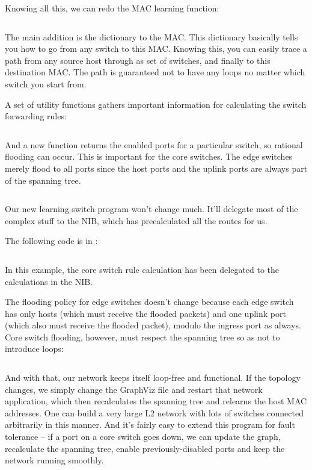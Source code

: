 Knowing all this, we can redo the MAC learning function:

\inputminted[firstline=116,lastline=148]{python}{code/multiswitch_topologies/network_information_base_from_file.py}

The main addition is the  dictionary to the MAC.   This dictionary basically tells you how to
go from any switch to this MAC.  Knowing this, you can easily trace a path from any source host through as set
of switches, and finally to this destination MAC.  The path is guaranteed not to have any loops no matter
which switch you start from.  

A set of utility functions gathers important information for calculating the switch 
forwarding rules:

\inputminted[firstline=95,lastline=115]{python}{code/multiswitch_topologies/network_information_base_from_file.py}

And a new function returns the enabled ports for a particular switch, so rational flooding can occur.
This is important for the core switches.  The edge switches merely flood to all ports since the host ports
and the uplink ports are always part of the spanning tree.   

\inputminted[firstline=194,lastline=196]{python}{code/multiswitch_topologies/network_information_base_from_file.py}

Our new learning switch program won't change much.  It'll delegate most of the complex stuff to the 
NIB, which has precalculated all the routes for us.  

The following code is in :

\inputminted[firstline=62,lastline=71]{python}{code/multiswitch_topologies/multiswitch3.py}

In this example, the core switch rule calculation has been delegated to the  calculations in
the NIB.  

The flooding policy for edge switches doesn't change because each edge switch has only hosts (which must
receive the flooded packets) and one uplink port (which also must receive the flooded packet), modulo the
ingress port as always.  Core switch flooding, however, must respect the spanning tree so as not to
introduce loops:

\inputminted[firstline=22,lastline=26]{python}{code/multiswitch_topologies/multiswitch3.py}

And with that, our network keeps itself loop-free and functional.  If the topology changes, we simply
change the GraphViz file and restart that network application, which then recalculates the spanning
tree and relearns the host MAC addresses.  One can build a very large L2 network with lots of 
switches connected arbitrarily in this manner.  And it's fairly easy to extend this program for fault
tolerance -- if a port on a core switch goes down, we can update the graph, recalculate the spanning
tree, enable previously-disabled ports and keep the network running smoothly.  


